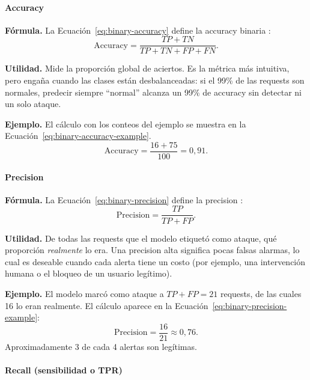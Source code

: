 \documentclass[12pt,oneside]{report}
\begin{document}
\paragraph{Accuracy}

\textbf{Fórmula.} La Ecuación~\eqref{eq:binary-accuracy} define la accuracy binaria \cite{sokolova_lapalme_2009}:
\begin{equation}
\label{eq:binary-accuracy}
\mathrm{Accuracy}=\frac{TP+TN}{TP+TN+FP+FN}.
\end{equation}

\textbf{Utilidad.} Mide la proporción global de aciertos. Es la métrica
más intuitiva, pero engaña cuando las clases están desbalanceadas: si el
99\% de las requests son normales, predecir siempre ``normal'' alcanza
un 99\% de accuracy sin detectar ni un solo ataque.

\textbf{Ejemplo.} El cálculo con los conteos del ejemplo se muestra en la Ecuación~\eqref{eq:binary-accuracy-example}.
\begin{equation}
\label{eq:binary-accuracy-example}
\mathrm{Accuracy}=\frac{16+75}{100}=0{,}91.
\end{equation}

\paragraph{Precision}

\textbf{Fórmula.} La Ecuación~\eqref{eq:binary-precision} define la precision \cite{sokolova_lapalme_2009,powers2011}:
\begin{equation}
\label{eq:binary-precision}
\mathrm{Precision}=\frac{TP}{TP+FP}.
\end{equation}

\textbf{Utilidad.} De todas las requests que el modelo etiquetó como
ataque, qué proporción \emph{realmente} lo era. Una precision alta
significa pocas falsas alarmas, lo cual es deseable cuando cada alerta
tiene un costo (por ejemplo, una intervención humana o el bloqueo de un
usuario legítimo).

\textbf{Ejemplo.} El modelo marcó como ataque a $TP+FP=21$ requests, de
las cuales 16 lo eran realmente. El cálculo aparece en la Ecuación~\eqref{eq:binary-precision-example}:
\begin{equation}
\label{eq:binary-precision-example}
\mathrm{Precision}=\frac{16}{21}\approx 0{,}76.
\end{equation}
Aproximadamente 3 de cada 4 alertas son legítimas.

\paragraph{Recall (sensibilidad o TPR)}
\end{document}
